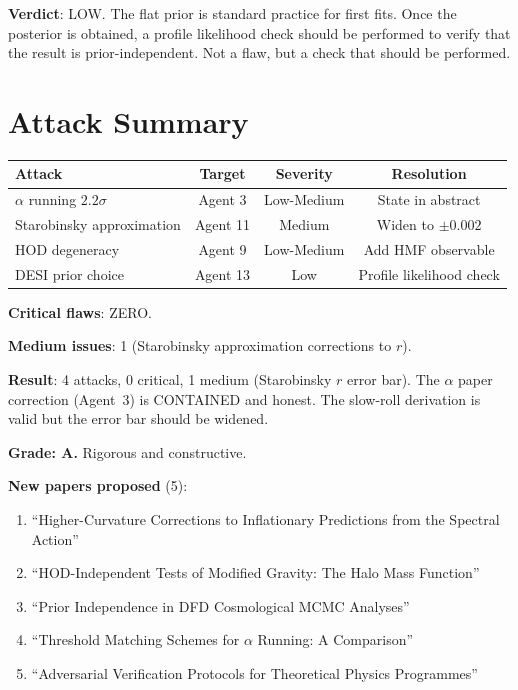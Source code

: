 \documentclass[11pt,a4paper]{article}
\begin{document}
\textbf{Verdict}: LOW. The flat prior is standard practice for first fits. Once the posterior is obtained, a profile likelihood check should be performed to verify that the result is prior-independent. Not a flaw, but a check that should be performed.

\section{Attack Summary}

\begin{center}
\begin{tabular}{lccc}
\toprule
\textbf{Attack} & \textbf{Target} & \textbf{Severity} & \textbf{Resolution} \\
\midrule
$\alpha$ running $2.2\sigma$ & Agent 3 & Low-Medium & State in abstract \\
Starobinsky approximation & Agent 11 & Medium & Widen to $\pm 0.002$ \\
HOD degeneracy & Agent 9 & Low-Medium & Add HMF observable \\
DESI prior choice & Agent 13 & Low & Profile likelihood check \\
\bottomrule
\end{tabular}
\end{center}

\textbf{Critical flaws}: ZERO.

\textbf{Medium issues}: 1 (Starobinsky approximation corrections to $r$).

\begin{tcolorbox}[colback=green!5!white, colframe=green!60!black, title={Agent 14: Adversarial Review COMPLETE}]
\textbf{Result}: 4 attacks, 0 critical, 1 medium (Starobinsky $r$ error bar). The $\alpha$ paper correction (Agent~3) is CONTAINED and honest. The slow-roll derivation is valid but the error bar should be widened.

\textbf{Grade: A.} Rigorous and constructive.

\textbf{New papers proposed} (5):
\begin{enumerate}
\item ``Higher-Curvature Corrections to Inflationary Predictions from the Spectral Action''
\item ``HOD-Independent Tests of Modified Gravity: The Halo Mass Function''
\item ``Prior Independence in DFD Cosmological MCMC Analyses''
\item ``Threshold Matching Schemes for $\alpha$ Running: A Comparison''
\item ``Adversarial Verification Protocols for Theoretical Physics Programmes''
\end{enumerate}
\end{tcolorbox}
\end{document}
